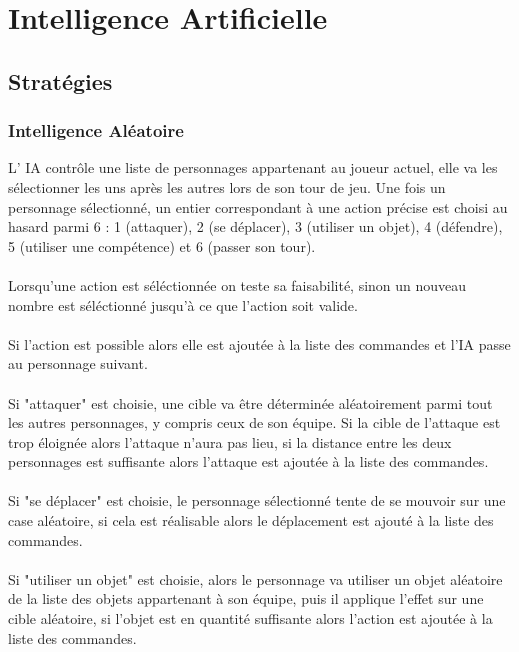 \chapter{Intelligence Artificielle}

\section{Stratégies}

\subsection{Intelligence Aléatoire}

L’ IA contrôle une liste de personnages appartenant au joueur actuel,
elle va les sélectionner les uns après les autres lors de son tour 
de jeu.
Une fois un personnage sélectionné, un entier correspondant à une 
action précise est choisi au hasard parmi 6 : 1 (attaquer), 2 (se 
déplacer), 3 (utiliser un objet), 4 (défendre), 5 (utiliser une 
compétence) et 6 (passer son tour).
\\\\
Lorsqu'une action est séléctionnée on teste sa faisabilité, sinon un 
nouveau nombre est séléctionné jusqu'à ce que l'action soit valide. 
\\\\
Si l'action est possible alors elle est ajoutée à la liste des 
commandes et l'IA passe au personnage suivant.
\\\\
Si "attaquer" est choisie, une cible va être déterminée aléatoirement
parmi tout les autres personnages, y compris ceux de son équipe. Si 
la cible de l'attaque est trop éloignée alors l’attaque n’aura pas 
lieu, si la distance entre les deux personnages est suffisante alors 
l'attaque est ajoutée à la liste des commandes.
\\\\
Si "se déplacer" est choisie, le personnage sélectionné tente de se 
mouvoir sur une case aléatoire, si cela est réalisable alors le 
déplacement est ajouté à la liste des commandes.
\\\\
Si "utiliser un objet" est choisie, alors le personnage va utiliser 
un objet aléatoire de la liste des objets appartenant à son équipe, 
puis il applique l'effet sur une cible aléatoire, si l'objet est en 
quantité suffisante alors l'action est ajoutée à la liste des 
commandes.
\\\\
